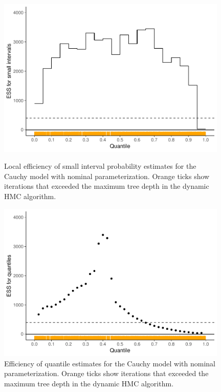 \documentclass[american,]{article}
\theoremstyle{definition}
\begin{document}
\begin{figure}[tp]
  \centering
  \begin{minipage}{0.48\textwidth}
  \includegraphics[width=0.98\textwidth]{graphics/local-ess-fit-nom-1.pdf}
  \caption{Local efficiency of small interval probability
    estimates for the Cauchy model with nominal parameterization. Orange
    ticks show iterations that exceeded the maximum tree depth in
    the dynamic HMC algorithm.}
\label{fig:local-ess-fit-nom-1}
\end{minipage}
\hfill
  \begin{minipage}{0.48\textwidth}
  \includegraphics[width=0.98\textwidth]{graphics/quantile-ess-fit-nom-1.pdf}
  \caption{Efficiency of quantile estimates for the Cauchy model with nominal 
  parameterization. Orange ticks show iterations that exceeded the maximum 
  tree depth in the dynamic HMC algorithm.\\~}
  \label{fig:quantile-ess-fit-nom-1}
\end{minipage}
\end{figure}
\end{document}
